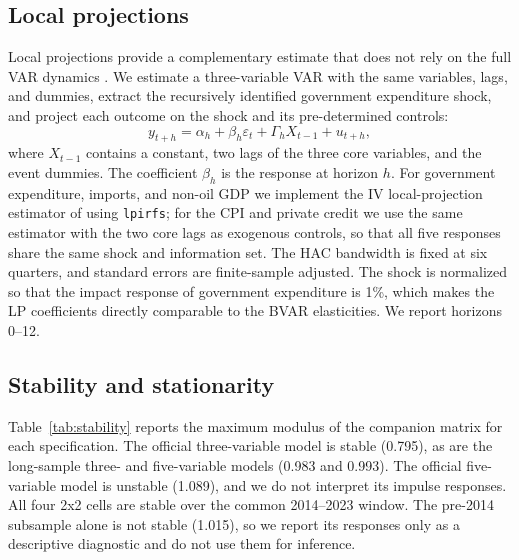 \documentclass[11pt,a4paper]{article}
\begin{document}
\subsection{Local projections}
\label{sec:lp}

Local projections provide a complementary estimate that does not rely on the full VAR dynamics \parencite{jorda2005}. We estimate a three-variable VAR with the same variables, lags, and dummies, extract the recursively identified government expenditure shock, and project each outcome on the shock and its pre-determined controls:
\[
y_{t+h} = \alpha_h + \beta_h \varepsilon_t + \Gamma_h X_{t-1} + u_{t+h},
\]
where $X_{t-1}$ contains a constant, two lags of the three core variables, and the event dummies. The coefficient $\beta_h$ is the response at horizon $h$. For government expenditure, imports, and non-oil GDP we implement the IV local-projection estimator of \textcite{adammer2019} using \texttt{lpirfs}; for the CPI and private credit we use the same estimator with the two core lags as exogenous controls, so that all five responses share the same shock and information set. The HAC bandwidth is fixed at six quarters, and standard errors are finite-sample adjusted. The shock is normalized so that the impact response of government expenditure is 1\%, which makes the LP coefficients directly comparable to the BVAR elasticities. We report horizons 0--12.

\subsection{Stability and stationarity}
\label{sec:stability}

Table~\ref{tab:stability} reports the maximum modulus of the companion matrix for each specification. The official three-variable model is stable (0.795), as are the long-sample three- and five-variable models (0.983 and 0.993). The official five-variable model is unstable (1.089), and we do not interpret its impulse responses. All four 2x2 cells are stable over the common 2014--2023 window. The pre-2014 subsample alone is not stable (1.015), so we report its responses only as a descriptive diagnostic and do not use them for inference.
\end{document}
